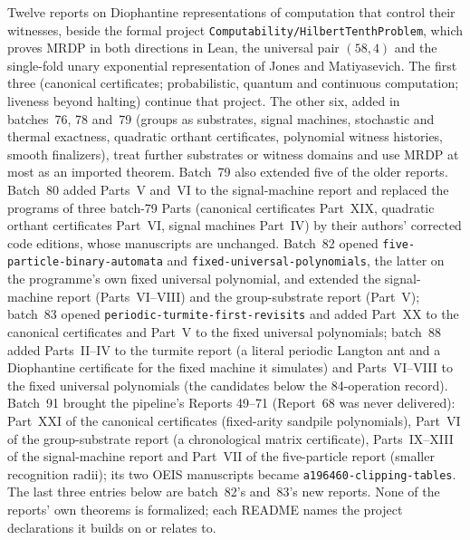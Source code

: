 \documentclass[11pt]{article}
\newcommand{\dir}[1]{\texttt{#1}}
\begin{document}
Twelve reports on Diophantine representations of computation that control
their witnesses, beside the formal project
\dir{Computability/HilbertTenthProblem}, which proves MRDP in both
directions in Lean, the universal pair $(58,4)$ and the single-fold unary
exponential representation of Jones and Matiyasevich.  The first three
(canonical certificates; probabilistic, quantum and continuous computation;
liveness beyond halting) continue that project.  The other six, added in
batches~76, 78 and~79 (groups as substrates, signal machines, stochastic and
thermal exactness, quadratic orthant certificates, polynomial witness
histories, smooth finalizers), treat further substrates or witness domains
and use MRDP at most as an imported theorem.  Batch~79 also extended five
of the older reports.  Batch~80 added Parts~V and~VI to the signal-machine
report and replaced the programs of three batch-79 Parts (canonical
certificates Part~XIX, quadratic orthant certificates Part~VI, signal
machines Part~IV) by their authors' corrected code editions, whose
manuscripts are unchanged.  Batch~82 opened
\dir{five-particle-binary-automata} and \dir{fixed-universal-polynomials},
the latter on the programme's own fixed universal polynomial, and extended
the signal-machine report (Parts~VI--VIII) and the group-substrate report
(Part~V); batch~83 opened \dir{periodic-turmite-first-revisits} and added
Part~XX to the canonical certificates and Part~V to the fixed universal
polynomials; batch~88 added Parts~II--IV to the turmite report (a literal
periodic Langton ant and a Diophantine certificate for the fixed machine it
simulates) and Parts~VI--VIII to the fixed universal polynomials (the
candidates below the 84-operation record).  Batch~91 brought the
pipeline's Reports 49--71 (Report~68 was never delivered): Part~XXI of the
canonical certificates (fixed-arity sandpile polynomials), Part~VI of the
group-substrate report (a chronological matrix certificate), Parts~IX--XIII
of the signal-machine report and Part~VII of the five-particle report
(smaller recognition radii); its two OEIS manuscripts became
\dir{a196460-clipping-tables}.  The last three entries below
are batch~82's and~83's new reports.  None of the
reports' own theorems is formalized; each README names the project
declarations it builds on or relates to.
\end{document}
